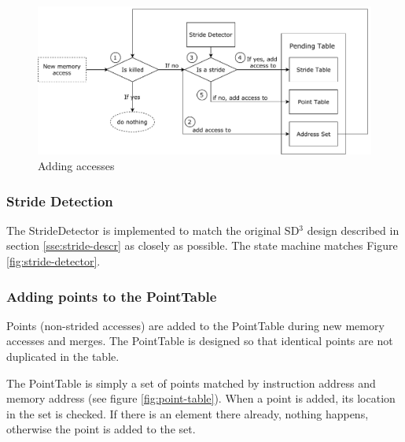 \documentclass[12pt,twoside]{reedthesis}
\begin{document}
		
		\begin{figure}
			\caption{Adding accesses}
			\label{fig:add-access}
			\includegraphics[scale=0.7]{add_access.pdf}
		\end{figure}
		
		
		\subsubsection{Stride Detection}
		
		The StrideDetector is implemented to match the original SD$^3$ design described in section \ref{sse:stride-descr} as closely as possible. The state machine matches Figure \ref{fig:stride-detector}.
		
		\subsubsection{Adding points to the PointTable}
		
			Points (non-strided accesses) are added to the PointTable during new memory accesses and merges. The PointTable is designed so that identical points are not duplicated in the table. 
			
			The PointTable is simply a set of points matched by instruction address and memory address (see figure \ref{fig:point-table}). When a point is added, its location in the set is checked. If there is an element there already, nothing happens, otherwise the point is added to the set. 
			
\end{document}
